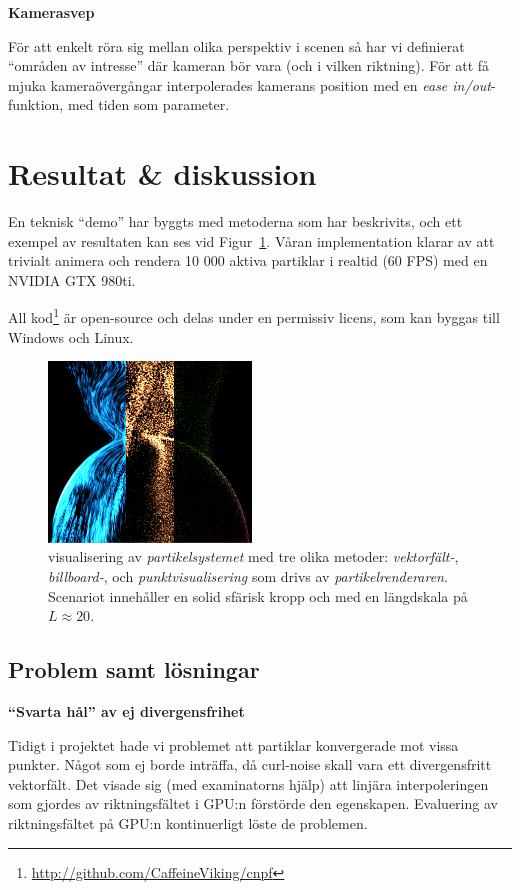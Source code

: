 \documentclass[a4paper]{article}
\begin{document}
\begin{multicols}{2}
\textbf{Kamerasvep}

För att enkelt röra sig mellan olika perspektiv i scenen så har vi definierat ``områden av intresse'' där kameran bör vara (och i vilken riktning).  För att få mjuka kameraövergångar interpolerades kamerans position med en \emph{ease in/out}-funktion, med tiden som parameter.

\section{Resultat \& diskussion} \label{sec:results}

En teknisk ``demo'' har byggts med metoderna som har beskrivits, och ett exempel av resultaten kan ses vid Figur~\ref{fig:verysexy}. Våran implementation klarar av att trivialt animera och rendera 10 000 aktiva partiklar i realtid (60 FPS) med en NVIDIA GTX 980ti.

All kod\footnote{\url{http://github.com/CaffeineViking/cnpf}} är open-source och delas under en permissiv licens, som kan byggas till Windows och Linux.

\begin{figure}[H]
\center
\includegraphics[width=0.48\textwidth]{share/merged_shaders.png}
    \caption{visualisering av \emph{partikelsystemet} med tre olika metoder: \emph{vektorfält-}, \emph{billboard-}, och \emph{punktvisualisering} som drivs av \emph{partikelrenderaren}. Scenariot innehåller en solid sfärisk kropp och med en längdskala på \(L\approx20\).}
\label{fig:verysexy}
\end{figure}

        \subsection{Problem samt lösningar}

            \textbf{``Svarta hål'' av ej divergensfrihet}

            Tidigt i projektet hade vi problemet att partiklar konvergerade mot vissa punkter. Något som ej borde inträffa, då curl-noise skall vara ett divergensfritt vektorfält. Det visade sig (med examinatorns hjälp) att linjära interpoleringen som gjordes av riktningsfältet i GPU:n förstörde den egenskapen. Evaluering av riktningsfältet på GPU:n kontinuerligt löste de problemen.


\end{multicols}
\end{document}
